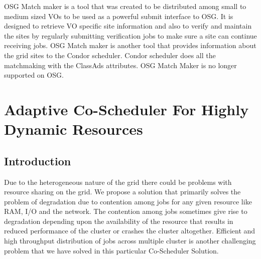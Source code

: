 \documentclass[ms,electronic,double]{nuthesis}
\begin{document}
OSG Match maker is a tool that was created to be distributed among small to 
medium sized VOs to be used as a powerful submit interface to OSG. It is 
designed to retrieve VO specific site information and also to verify and 
maintain the sites by regularly submitting verification jobs to make sure a site 
can continue receiving jobs.
OSG Match maker is another tool that provides information about the grid sites to the 
Condor scheduler. Condor scheduler does all the matchmaking with the ClassAds attributes. 
OSG Match Maker is no longer supported on OSG.
  

\chapter{Adaptive Co-Scheduler For Highly Dynamic Resources}

\section{Introduction}
Due to the heterogeneous nature of the grid there could be problems with resource sharing on the grid. We propose a solution that primarily solves the problem of degradation due to contention among 
jobs for any given resource like RAM, I/O and the network. The contention among jobs sometimes give rise to 
degradation depending upon the availability of the resource that results in reduced performance of the cluster or crashes the cluster
altogether. Efficient and high throughput
distribution of jobs across multiple cluster is another challenging problem that we have solved in 
this particular Co-Scheduler Solution. 
\end{document}
